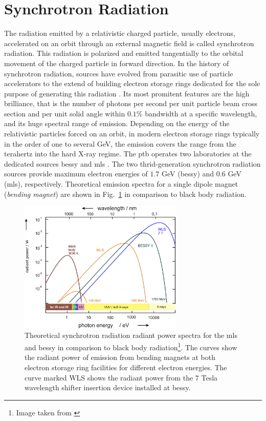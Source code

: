 \section{Synchrotron Radiation}
The radiation emitted by a relativistic charged particle, usually electrons, accelerated on an orbit through an external magnetic field is called synchrotron radiation. This radiation is polarized and emitted tangentially to the orbital movement of the charged particle in forward direction. In the history of synchrotron radiation, sources have evolved from parasitic use of particle accelerators to the extend of building electron storage rings dedicated for the sole purpose of generating this radiation \cite{munro_chapter_1987}. Its most promitent features are the high brilliance, that is the number of photons per second per unit particle beam cross section and per unit solid angle within $0.1\%$ bandwidth at a specific wavelength, and its huge spectral range of emission. Depending on the energy of the relativistic particles forced on an orbit, in modern electron storage rings typically in the order of one to several GeV, the emission covers the range from the terahertz into the hard X-ray regime. The \gls{ptb} operates two laboratories at the dedicated sources \gls{bessy} and \gls{mls} \cite{brandt_metrology_2007}. The two thrid-generation synchrotron radiation sources provide maximum electron energies of $1.7$ GeV (\gls{bessy}) and $0.6$ GeV (\gls{mls}), respectively. Theoretical emission spectra for a single dipole magnet (\emph{bending magnet}) are shown in Fig.~\ref{ch_exp:fig_experimental_synchrotron_spectra} in comparison to black body radiation.
\begin{figure}
 \includegraphics[width=0.7\textwidth]{img/exp-bessy-dipole-spectrum.jpeg}
 \caption[Theoretical synchrotron radiation radiant power spectra]{Theoretical synchrotron radiation radiant power spectra for the \gls{mls} and \gls{bessy} in comparison to black body radiation\footnote{Image taken from \textcite{beckhoff_quarter-century_2009}}. The curves show the radiant power of emission from bending magnets at both electron storage ring facilities for different electron energies. The curve marked WLS shows the radiant power from the $7$ Tesla wavelength shifter insertion device installed at \gls{bessy}.}
 \label{ch_exp:fig_experimental_synchrotron_spectra}
\end{figure}

